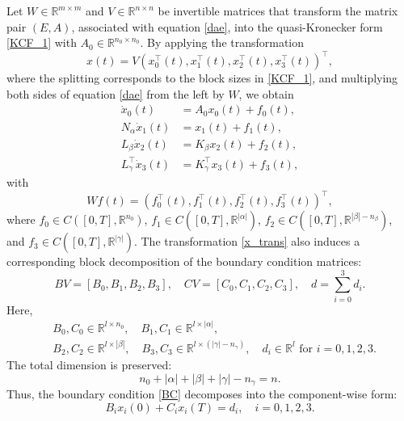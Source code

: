 \documentclass[preprint,12pt]{elsarticle}
\numberwithin{equation}{section}
\theoremstyle{definition}
\begin{document}
Let  $W \in \mathbb{R}^{m\times m}$ and $V \in \mathbb{R}^{n\times n}$ be invertible matrices that transform the matrix pair $(E,A)$, associated with equation \eqref{dae}, into the quasi-Kronecker form \eqref{KCF_1} with $A_0\in \mathbb{R}^{n_0\times n_0}$. By applying the transformation
\begin{equation}\label{x_trans}x(t)=V\left(x_0^\top(t), x_1^\top(t), x_2^\top(t), x_3^\top(t)\right)^{\top},\end{equation}
where the splitting corresponds to the block sizes in \eqref{KCF_1}, and multiplying both sides of  equation \eqref{dae} from the left by $W$, we obtain 
\begin{subequations}\label{111}\begin{align}
   \dot{x}_0(t)&=A_0x_0(t)+f_0(t),\label{11x_difeq}\\
N_{\alpha}\dot{x}_1(t)&=x_1(t)+f_1(t),\label{11x_alg_eq}\\
L_{\beta}\dot{x}_2 (t)&=K_{\beta}x_2(t)+
f_2(t),\label{11x_under_eq}\\
L_{\gamma}^\top\dot{x}_3(t)&=K_{\gamma}^\top x_3(t)+f_3(t),\label{11x_over_eq}
\end{align}
\end{subequations}
with
\begin{equation*}
   Wf(t)=\left(f_0^\top(t), f_1^\top(t), f_2^\top(t), f_3^\top(t)\right)^{\top},
\end{equation*}
where $f_0\in C([0,T],\mathbb{R}^{n_0})$, $f_1\in C([0,T],\mathbb{R}^{|\alpha|})$, $f_2 \in C([0,T],\mathbb{R}^{|\beta|-n_\beta})$, and $f_3\in C([0,T],\mathbb{R}^{|\gamma|})$. The transformation \eqref{x_trans} also induces a corresponding block decomposition of the boundary condition matrices:
\begin{equation*}\label{BC_blocks}
   BV=[B_0, B_1, B_2, B_3], \quad  CV=[C_0, C_1, C_2, C_3], \quad d = \sum\limits_{i=0}^3 d_i.
\end{equation*}
Here,
\[
\begin{aligned}
    &B_0, C_0 \in \mathbb{R}^{l \times n_0}, \quad
    B_1, C_1 \in \mathbb{R}^{l \times |\alpha|}, \\
    &B_2, C_2 \in \mathbb{R}^{l \times |\beta|}, \quad
    B_3, C_3 \in \mathbb{R}^{l \times (|\gamma| - n_{\gamma})}, \quad
    d_i \in \mathbb{R}^l \text{ for } i = 0,1,2,3.
\end{aligned}
\]
The total dimension is preserved:
\[
n_0 + |\alpha| + |\beta| + |\gamma| - n_{\gamma} = n.
\]
Thus, the boundary condition \eqref{BC} decomposes into the component-wise form:
\begin{equation}\label{BC_decomposed}
    B_i x_i(0) + C_i x_i(T) = d_i, \quad i = 0,1,2,3.
\end{equation}
\end{document}
